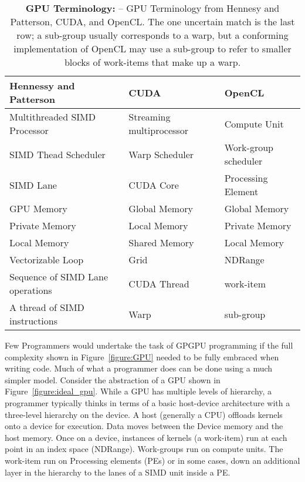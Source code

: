\begin{table}[!htbp]
\centering
\caption{\textbf{GPU Terminology: } 
-- \small
GPU Terminology from Hennesy and Patterson, CUDA, and 
OpenCL.   The one uncertain match is the last row;
a sub-group usually corresponds to a warp, but a conforming implementation of OpenCL 
may use a sub-group to refer to smaller blocks of work-items that make up a warp.}
\label{table:GPUjargon}
\begin{tabular}{|l|l|l|}
\hline
\textbf{Hennessy and Patterson}  & \textbf{CUDA} & \textbf{OpenCL} \\
\hline
Multithreaded SIMD Processor    & Streaming multiprocessor & Compute Unit \\
\hline
SIMD Thead Scheduler               & Warp Scheduler                 & Work-group scheduler \\
\hline
SIMD Lane                                  & CUDA Core                        & Processing Element \\
\hline
GPU Memory                              & Global Memory                   & Global Memory \\
\hline
Private Memory                          & Local Memory                     & Private Memory \\
\hline
Local Memory                            & Shared Memory                   & Local Memory \\
\hline
Vectorizable Loop                       & Grid                                     & NDRange \\
\hline
Sequence of SIMD Lane operations & CUDA Thread                & work-item \\
\hline
A thread of SIMD instructions            & Warp                              & sub-group \\
\hline
\end{tabular}
\end{table}

Few Programmers would undertake the task of GPGPU programming if the full complexity shown in Figure~\ref{figure:GPU}
needed to be fully embraced when writing code.  Much of what a programmer does can be done using a much 
simpler model.  Consider the abstraction of a GPU shown in Figure~\ref{figure:ideal_gpu}.
While a GPU has multiple levels of hierarchy, a programmer typically thinks in terms of a basic host-device
architecture with a three-level hierarchy on the device.  A host (generally a CPU) offloads kernels onto a device
for execution.   Data moves between the Device memory and the host memory.   Once on a device, instances 
of kernels (a work-item) run at each point in an index space (NDRange).  Work-groups run on compute units.
The work-item run on Processing elements (PEs) or in some cases, down an additional layer in the hierarchy to 
the lanes of a SIMD unit inside a PE.


